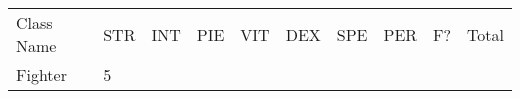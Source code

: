 \documentclass[12pt]{article}
\newcommand{\indexClass}[1]{\index{#1}}
\newcommand{\class}[1]{#1\indexClass{#1}}
\begin{document}
\begin{longtable}[]{@{}llllllllll@{}}
\toprule
\begin{minipage}[t]{0.13\columnwidth}\raggedright\strut
Class Name
\strut\end{minipage} &
\begin{minipage}[t]{0.06\columnwidth}\raggedright\strut
STR
\strut\end{minipage} &
\begin{minipage}[t]{0.06\columnwidth}\raggedright\strut
INT
\strut\end{minipage} &
\begin{minipage}[t]{0.06\columnwidth}\raggedright\strut
PIE
\strut\end{minipage} &
\begin{minipage}[t]{0.06\columnwidth}\raggedright\strut
VIT
\strut\end{minipage} &
\begin{minipage}[t]{0.06\columnwidth}\raggedright\strut
DEX
\strut\end{minipage} &
\begin{minipage}[t]{0.06\columnwidth}\raggedright\strut
SPE
\strut\end{minipage} &
\begin{minipage}[t]{0.06\columnwidth}\raggedright\strut
PER
\strut\end{minipage} &
\begin{minipage}[t]{0.07\columnwidth}\raggedright\strut
F?
\strut\end{minipage} &
\begin{minipage}[t]{0.08\columnwidth}\raggedright\strut
Total
\strut\end{minipage}\tabularnewline
\begin{minipage}[t]{0.13\columnwidth}\raggedright\strut
\class{Fighter}
\strut\end{minipage} &
\begin{minipage}[t]{0.06\columnwidth}\raggedright\strut
5
\strut\end{minipage} &
\begin{minipage}[t]{0.06\columnwidth}\raggedright\strut
\strut\end{minipage} &
\begin{minipage}[t]{0.06\columnwidth}\raggedright\strut
\strut\end{minipage} &
\begin{minipage}[t]{0.06\columnwidth}\raggedright\strut
\strut\end{minipage} &
\begin{minipage}[t]{0.06\columnwidth}\raggedright\strut

\end{minipage}
\end{longtable}
\end{document}
